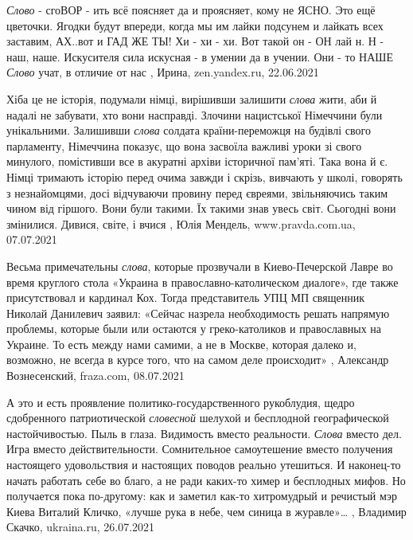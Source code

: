 \emph{Слово} - сгоВОР - ить всё поясняет да и проясняет, кому не ЯСНО.  Это ещё
цветочки. Ягодки будут впереди, когда мы им лайки подсунем и лайкать всех
заставим, АХ..вот и ГАД ЖЕ ТЫ! Хи - хи - хи. Вот такой он - ОН лай н. Н - наш,
наше. Искусителя сила искусная - в умении да в учении. Они - то НАШЕ \emph{Слово}
учат, в отличие от нас
, 
Ирина, zen.yandex.ru, 22.06.2021

Хіба це не історія, подумали німці, вирішивши залишити \emph{слова} жити, аби й надалі
не забувати, хто вони насправді.  Злочини нацистської Німеччини були
унікальними. Залишивши \emph{слова} солдата країни-переможця на будівлі свого
парламенту, Німеччина показує, що вона засвоїла важливі уроки зі свого
минулого, помістивши все в акуратні архіви історичної пам’яті. Така вона й є.
Німці тримають історію перед очима завжди і скрізь, вивчають у школі, говорять
з незнайомцями, досі відчуваючи провину перед євреями, звільняючись таким чином
від гіршого. Вони були такими. Їх такими знав увесь світ. Сьогодні вони
змінилися. Дивися, світе, і вчися
, 
Юлія Мендель, www.pravda.com.ua, 07.07.2021

Весьма примечательны \emph{слова}, которые прозвучали в Киево-Печерской Лавре во время
круглого стола «Украина в православно-католическом диалоге», где также
присутствовал и кардинал Кох. Тогда представитель УПЦ МП священник Николай
Данилевич заявил: «Сейчас назрела необходимость решать напрямую проблемы,
которые были или остаются у греко-католиков и православных на Украине. То есть
между нами самими, а не в Москве, которая далеко и, возможно, не всегда в курсе
того, что на самом деле происходит»
, 
Александр Вознесенский, fraza.com, 08.07.2021

А это и есть проявление политико-государственного рукоблудия, щедро сдобренного
патриотической \emph{словесной} шелухой и бесплодной географической настойчивостью.
Пыль в глаза. Видимость вместо реальности. \emph{Слова} вместо дел. Игра вместо
действительности. Сомнительное самоутешение вместо получения настоящего
удовольствия и настоящих поводов реально утешиться. И наконец-то начать
работать себе во благо, а не ради каких-то химер и бесплодных мифов.
Но получается пока по-другому: как и заметил как-то хитромудрый и речистый мэр
Киева Виталий Кличко, «лучше рука в небе, чем синица в журавле»…
, 
Владимир Скачко, ukraina.ru, 26.07.2021

